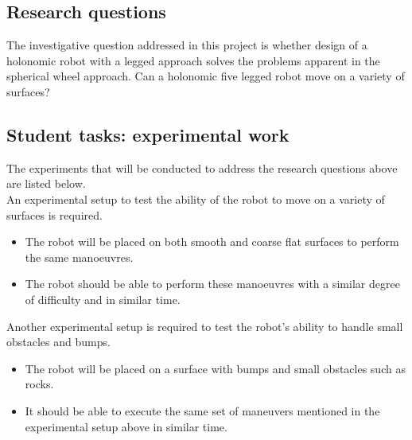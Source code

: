 \vspace{1em}

\subsection{Research questions}
The investigative question addressed in this project is whether design of a holonomic robot with a legged approach solves the problems apparent in the spherical wheel approach. Can a holonomic five legged robot move on a variety of surfaces?

\subsection{Student tasks: experimental work}
The experiments that will be conducted to address the research questions above are listed below.\\

An experimental setup to test the ability of the robot to move on a variety of surfaces is required.
\begin{itemize}
\item The robot will be placed on both smooth and coarse flat surfaces to perform the same manoeuvres.
\item The robot should be able to perform these manoeuvres with a similar degree of difficulty and in similar time.
\end{itemize}
Another experimental setup is required to test the robot's ability to handle small obstacles and bumps.
\begin{itemize}
\item The robot will be placed on a surface with bumps and small obstacles such as rocks.
\item It should be able to execute the same set of maneuvers mentioned in the experimental setup above in similar time.
\end{itemize}
\newpage 



